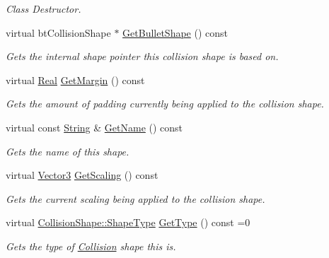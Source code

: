 \begin{DoxyCompactItemize}
\begin{DoxyCompactList}\small\item\em Class Destructor. \item\end{DoxyCompactList}\item 
virtual btCollisionShape $\ast$ \hyperlink{classMezzanine_1_1CollisionShape_a0a5d6eb69c26665051ebb2b9d8004802}{GetBulletShape} () const 
\begin{DoxyCompactList}\small\item\em Gets the internal shape pointer this collision shape is based on. \item\end{DoxyCompactList}\item 
virtual \hyperlink{namespaceMezzanine_a726731b1a7df72bf3583e4a97282c6f6}{Real} \hyperlink{classMezzanine_1_1CollisionShape_a7f9d28c4c5ce7ab5a78af217d314fcaa}{GetMargin} () const 
\begin{DoxyCompactList}\small\item\em Gets the amount of padding currently being applied to the collision shape. \item\end{DoxyCompactList}\item 
virtual const \hyperlink{namespaceMezzanine_acf9fcc130e6ebf08e3d8491aebcf1c86}{String} \& \hyperlink{classMezzanine_1_1CollisionShape_af3f50f7ee9cb2d25c88daf0c92facb31}{GetName} () const 
\begin{DoxyCompactList}\small\item\em Gets the name of this shape. \item\end{DoxyCompactList}\item 
virtual \hyperlink{classMezzanine_1_1Vector3}{Vector3} \hyperlink{classMezzanine_1_1CollisionShape_ac05c6969066a1ab14c45aa566da701b6}{GetScaling} () const 
\begin{DoxyCompactList}\small\item\em Gets the current scaling being applied to the collision shape. \item\end{DoxyCompactList}\item 
virtual \hyperlink{classMezzanine_1_1CollisionShape_ad04186055565998879b64176d6dd100d}{CollisionShape::ShapeType} \hyperlink{classMezzanine_1_1CollisionShape_a27e5055f81cb8fb6d65a6c9f8dc73b69}{GetType} () const =0
\begin{DoxyCompactList}\small\item\em Gets the type of \hyperlink{classMezzanine_1_1Collision}{Collision} shape this is. \item\end{DoxyCompactList}\item 

\end{DoxyCompactItemize}
